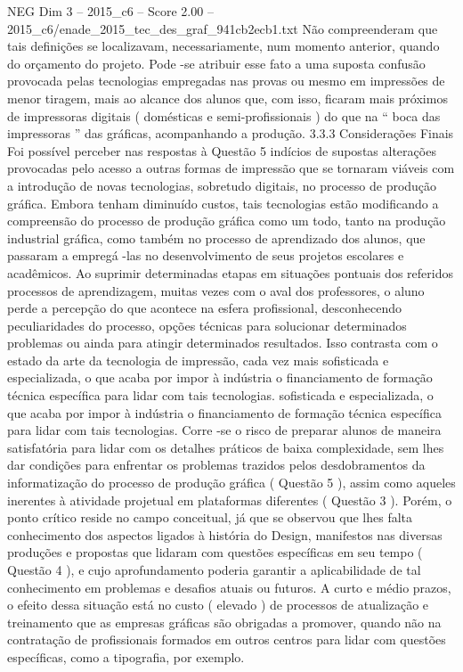 \begin{textsample}{NEG Dim 3 – 2015\_c6 – Score 2.00 – 2015\_c6/enade\_2015\_tec\_des\_graf\_941cb2ecb1.txt}
Não compreenderam que tais definições se localizavam, necessariamente, num momento anterior, quando do orçamento do projeto.
Pode -se atribuir esse fato a uma suposta confusão provocada pelas tecnologias empregadas nas provas ou mesmo em impressões de menor tiragem, mais ao alcance dos alunos que, com isso, ficaram mais próximos de impressoras digitais ( domésticas e semi-profissionais ) do que na “ boca das impressoras ” das gráficas, acompanhando a produção. 3.3.3 Considerações Finais Foi possível perceber nas respostas à Questão 5 indícios de supostas alterações provocadas pelo acesso a outras formas de impressão que se tornaram viáveis com a introdução de novas tecnologias, sobretudo digitais, no processo de produção gráfica.
Embora tenham diminuído custos, tais tecnologias estão modificando a compreensão do processo de produção gráfica como um todo, tanto na produção industrial gráfica, como também no processo de aprendizado dos alunos, que passaram a empregá -las no desenvolvimento de seus projetos escolares e acadêmicos.
Ao suprimir determinadas etapas em situações pontuais dos referidos processos de aprendizagem, muitas vezes com o aval dos professores, o aluno perde a percepção do que acontece na esfera profissional, desconhecendo peculiaridades do processo, opções técnicas para solucionar determinados problemas ou ainda para atingir determinados resultados.
Isso contrasta com o estado da arte da tecnologia de impressão, cada vez mais sofisticada e especializada, o que acaba por impor à indústria o financiamento de formação técnica específica para lidar com tais tecnologias. sofisticada e especializada, o que acaba por impor à indústria o financiamento de formação técnica específica para lidar com tais tecnologias.
Corre -se o risco de preparar alunos de maneira satisfatória para lidar com os detalhes práticos de baixa complexidade, sem lhes dar condições para enfrentar os problemas trazidos pelos desdobramentos da informatização do processo de produção gráfica ( Questão 5 ), assim como aqueles inerentes à atividade projetual em plataformas diferentes ( Questão 3 ).
Porém, o ponto crítico reside no campo conceitual, já que se observou que lhes falta conhecimento dos aspectos ligados à história do Design, manifestos nas diversas produções e propostas que lidaram com questões específicas em seu tempo ( Questão 4 ), e cujo aprofundamento poderia garantir a aplicabilidade de tal conhecimento em problemas e desafios atuais ou futuros.
A curto e médio prazos, o efeito dessa situação está no custo ( elevado ) de processos de atualização e treinamento que as empresas gráficas são obrigadas a promover, quando não na contratação de profissionais formados em outros centros para lidar com questões específicas, como a tipografia, por exemplo.

\end{textsample}
